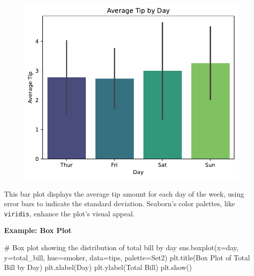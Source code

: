 \documentclass[
  letterpaper,
  DIV=11,
  numbers=noendperiod]{scrreprt}
\newenvironment{Shaded}{\begin{snugshade}}{\end{snugshade}}
\newcommand{\CommentTok}[1]{\textcolor[rgb]{0.37,0.37,0.37}{#1}}
\newcommand{\NormalTok}[1]{\textcolor[rgb]{0.00,0.23,0.31}{#1}}
\newcommand{\OperatorTok}[1]{\textcolor[rgb]{0.37,0.37,0.37}{#1}}
\newcommand{\StringTok}[1]{\textcolor[rgb]{0.13,0.47,0.30}{#1}}
\begin{document}
\begin{figure}[H]

{\centering \includegraphics{15_Data_Vis_files/figure-pdf/cell-13-output-2.pdf}

}

\end{figure}

This bar plot displays the average tip amount for each day of the week,
using error bars to indicate the standard deviation. Seaborn's color
palettes, like \texttt{viridis}, enhance the plot's visual appeal.

\textbf{Example: Box Plot}

\begin{Shaded}
\begin{Highlighting}[]
\CommentTok{\# Box plot showing the distribution of total bill by day}
\NormalTok{sns.boxplot(x}\OperatorTok{=}\StringTok{\textquotesingle{}day\textquotesingle{}}\NormalTok{, y}\OperatorTok{=}\StringTok{\textquotesingle{}total\_bill\textquotesingle{}}\NormalTok{, hue}\OperatorTok{=}\StringTok{\textquotesingle{}smoker\textquotesingle{}}\NormalTok{, data}\OperatorTok{=}\NormalTok{tips, palette}\OperatorTok{=}\StringTok{\textquotesingle{}Set2\textquotesingle{}}\NormalTok{)}
\NormalTok{plt.title(}\StringTok{\textquotesingle{}Box Plot of Total Bill by Day\textquotesingle{}}\NormalTok{)}
\NormalTok{plt.xlabel(}\StringTok{\textquotesingle{}Day\textquotesingle{}}\NormalTok{)}
\NormalTok{plt.ylabel(}\StringTok{\textquotesingle{}Total Bill\textquotesingle{}}\NormalTok{)}
\NormalTok{plt.show()}
\end{Highlighting}
\end{Shaded}
\end{document}
